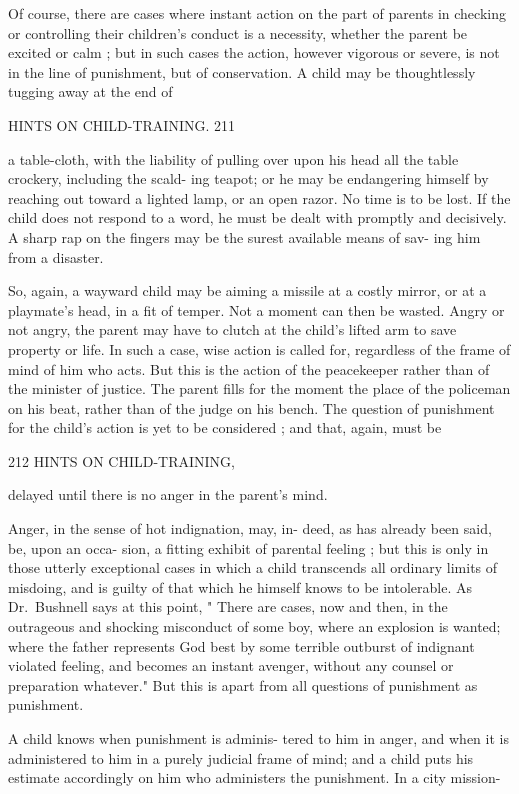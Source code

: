 \documentclass[
]{book}
\begin{document}
Of course, there are cases where instant action on the part of parents in checking or controlling their children's conduct is a necessity, whether the parent be excited or calm ; but in such cases the action, however vigorous or severe, is not in the line of punishment, but of conservation. A child may be thoughtlessly tugging away at the end of

HINTS ON CHILD-TRAINING. 211

a table-cloth, with the liability of pulling over upon his head all the table crockery, including the scald- ing teapot; or he may be endangering himself by reaching out toward a lighted lamp, or an open razor. No time is to be lost. If the child does not respond to a word, he must be dealt with promptly and decisively. A sharp rap on the fingers may be the surest available means of sav- ing him from a disaster.

So, again, a wayward child may be aiming a missile at a costly mirror, or at a playmate's head, in a fit of temper. Not a moment can then be wasted. Angry or not angry, the parent may have to clutch at the child's lifted arm to save property or life. In such a case, wise action is called for, regardless of the frame of mind of him who acts. But this is the action of the peacekeeper rather than of the minister of justice. The parent fills for the moment the place of the policeman on his beat, rather than of the judge on his bench. The question of punishment for the child's action is yet to be considered ; and that, again, must be

212 HINTS ON CHILD-TRAINING,

delayed until there is no anger in the parent's mind.

Anger, in the sense of hot indignation, may, in- deed, as has already been said, be, upon an occa- sion, a fitting exhibit of parental feeling ; but this is only in those utterly exceptional cases in which a child transcends all ordinary limits of misdoing, and is guilty of that which he himself knows to be intolerable. As Dr.~Bushnell says at this point, " There are cases, now and then, in the outrageous and shocking misconduct of some boy, where an explosion is wanted; where the father represents God best by some terrible outburst of indignant violated feeling, and becomes an instant avenger, without any counsel or preparation whatever." But this is apart from all questions of punishment as punishment.

A child knows when punishment is adminis- tered to him in anger, and when it is administered to him in a purely judicial frame of mind; and a child puts his estimate accordingly on him who administers the punishment. In a city mission-
\end{document}
